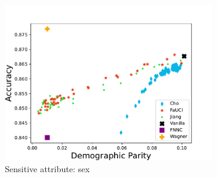 
\newcommand{\onethirdsize}{0.32\linewidth}

\begin{figure}%
    \centering
    \caption[Fairness-accuracy trade-off on the UCI Adult dataset]{%
        Experiments comparing \gls{FaUCI} to related works, using different (variants of) the \gls{DP}, \gls{DI}, and \gls{EO} fairness metrics.
        Each row corresponds to a different fairness metric (\gls{DP}, \gls{DI}, and \gls{EO}).
        Each column corresponds to a different variant of the fairness metric (normal, for binary attributes, weighted for categorical attributes, and generalised for continuous attributes).
        Each dot of each chart is the average of 5 runs (5-folds cross-validation).
        In each chart, red stars represent \gls{FaUCI}, blue diamonds Cho's method, green dots Jiang's method and the black cross the vanilla neural network (i.e., the \gls{NN} without fairness constraints).
        For \gls{FNNC} and \gls{LTN} we were not able to reproduce experiments, so we report the results as reported by the authors---which implies only one dot per chart.
    }
    \begin{subfigure}[]{\onethirdsize}
        \centering
        \includegraphics[width=\columnwidth]{figures/fauci/accuracy/demographic_parity_sex}
        \caption{Sensitive attribute: sex}
        \label{fig:dp-sex}
    \end{subfigure}
    \begin{subfigure}[]{\onethirdsize}

\end{subfigure}
\end{figure}
